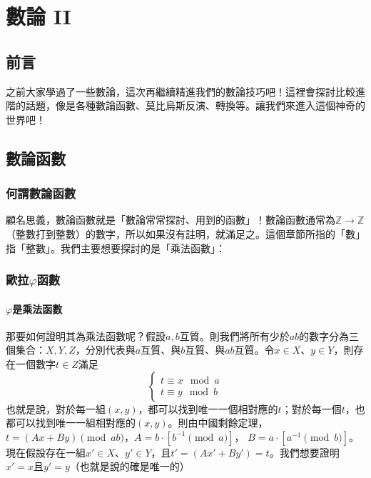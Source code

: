 \chapter{數論 II}
\section*{前言}
	之前大家學過了一些數論，這次再繼續精進我們的數論技巧吧！這裡會探討比較進階的話題，像是各種數論函數、莫比烏斯反演、轉換等。讓我們來進入這個神奇的世界吧！
\section*{數論函數}
	\subsection*{何謂數論函數}
	顧名思義，數論函數就是「數論常常探討、用到的函數」！數論函數通常為$\mathbb{Z} \rightarrow \mathbb{Z}$（整數打到整數）的數字，所以如果沒有註明，就滿足之。這個章節所指的「數」指「整數」。我們主要想要探討的是「乘法函數」：
	\subsection*{歐拉$\varphi$函數}
		\subsubsection{$\varphi$是乘法函數}
		那要如何證明其為乘法函數呢？假設$a, b$互質。則我們將所有少於$ab$的數字分為三個集合：$X, Y, Z$，分別代表與$a$互質、與$b$互質、與$ab$互質。令$x \in X$、$y \in Y$，則存在一個數字$t \in Z$滿足
		$$\begin{cases}
		t\equiv x \mod a\\
		t\equiv y \mod b
		\end{cases}$$
		也就是說，對於每一組$(x, y)$，都可以找到唯一一個相對應的$t$；對於每一個$t$，也都可以找到唯一一組相對應的$(x, y)$。則由中國剩餘定理，$t = (Ax + By) \pmod{ab}$，$A = b \cdot \left[b^{-1} \pmod a\right]$， $B = a \cdot \left[a^{-1} \pmod b\right]$。現在假設存在一組$x' \in X$、$y' \in Y$，且$t' = (Ax' + By') = t$。我們想要證明$x' = x$且$y' = y$（也就是說的確是唯一的）
		
